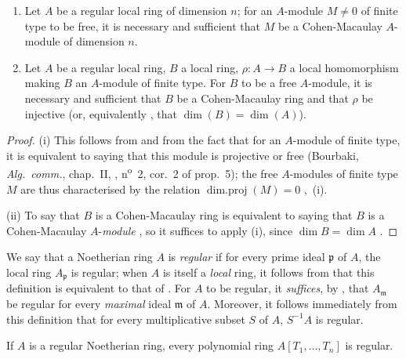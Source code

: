 
\begin{corollary}[17.3.5]
\label{0.17.3.5}
\begin{enumerate}
  \item[{\rm(i)}] Let $A$ be a regular local ring of dimension $n$; for an $A$-module $M\neq 0$ of finite type to be free, it is necessary and sufficient that $M$ be a Cohen-Macaulay $A$-module of dimension $n$.
  \item[{\rm(ii)}] Let $A$ be a regular local ring, $B$ a local ring, $\rho:A\to B$ a local homomorphism making $B$ an $A$-module of finite type.
  For $B$ to be a free $A$-module, it is necessary and sufficient that $B$ be a Cohen-Macaulay ring and that $\rho$ be injective \textup{(or, equivalently , that $\dim(B)=\dim(A)$)}.
\end{enumerate}
\end{corollary}

\begin{proof}
(i) This follows from  and from the fact that for an $A$-module of finite type, it is equivalent to saying that this module is projective or free (Bourbaki, \emph{Alg.~comm.}, chap.~II, , n\textsuperscript{o}~2, cor.~2 of prop.~5);
the free $A$-modules of finite type $M$ are thus characterised by the relation $\operatorname{dim.proj}(M)=0$ ,~(i).

(ii) To say that $B$ is a Cohen-Macaulay ring is equivalent to saying that $B$ is a Cohen-Macaulay $A$-\emph{module} , so it suffices to apply (i), since $\dim B=\dim A$ .
\end{proof}

\begin{env}[17.3.6]
\label{0.17.3.6}
We say that a Noetherian ring $A$ is \emph{regular} if for every prime ideal $\mathfrak{p}$ of $A$, the local ring $A_\mathfrak{p}$ is regular;
when $A$ is itself a \emph{local} ring, it follows from  that this definition is equivalent to that of .
For $A$ to be regular, it \emph{suffices}, by , that $A_\mathfrak{m}$ be regular for every \emph{maximal} ideal $\mathfrak{m}$ of $A$.
Moreover, it follows immediately from this definition that for every multiplicative subset $S$ of $A$, $S^{-1}A$ is regular.
\end{env}

\begin{proposition}[17.3.7]
\label{0.17.3.7}
If $A$ is a regular Noetherian ring, every polynomial ring $A[T_1,\ldots,T_n]$ is regular.
\end{proposition}


